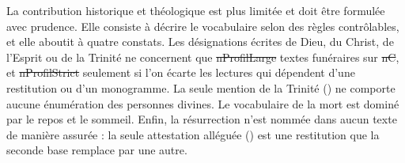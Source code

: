La contribution historique et théologique est plus limitée et doit être formulée avec prudence. Elle consiste à décrire le vocabulaire selon des règles contrôlables, et elle aboutit à quatre constats. Les désignations écrites de Dieu, du Christ, de l’Esprit ou de la Trinité ne concernent que \st{nProfilLarge} textes funéraires sur \st{nC}, et \st{nProfilStrict} seulement si l’on écarte les lectures qui dépendent d’une restitution ou d’un monogramme. La seule mention de la Trinité () ne comporte aucune énumération des personnes divines. Le vocabulaire de la mort est dominé par le repos et le sommeil. Enfin, la résurrection n’est nommée dans aucun texte de manière assurée : la seule attestation alléguée () est une restitution que la seconde base remplace par une autre.
